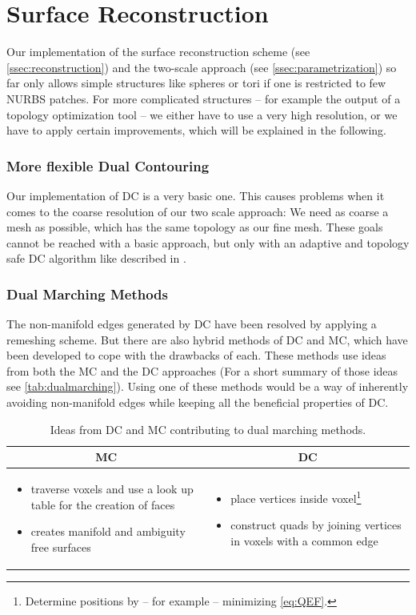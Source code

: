 \chapter{Surface Reconstruction}
\label{appx:AltSurfRecon}
Our implementation of the surface reconstruction scheme (see \autoref{ssec:reconstruction}) and the two-scale approach (see \autoref{ssec:parametrization}) so far only allows simple structures like spheres or tori if one is restricted to few NURBS patches. For more complicated structures -- for example the output of a topology optimization tool -- we either have to use a very high resolution, or we have to apply certain improvements, which will be explained in the following.

\subsection*{More flexible Dual Contouring}
Our implementation of \ac{DC} is a very basic one. This causes problems when it comes to the coarse resolution of our two scale approach: We need as coarse a mesh as possible, which has the same topology as our fine mesh. These goals cannot be reached with a basic approach, but only with an adaptive and topology safe \ac{DC} algorithm like described in \cite{Hermite2002}.

\subsection*{Dual Marching Methods}
The non-manifold edges generated by \ac{DC} have been resolved by applying a remeshing scheme. But there are also hybrid methods of \ac{DC} and \ac{MC}, which have been developed to cope with the drawbacks of each. These methods use ideas from both the \ac{MC} and the \ac{DC} approaches (For a short summary of those ideas see \autoref{tab:dualmarching}). Using one of these methods would be a way of inherently avoiding non-manifold edges while keeping all the beneficial properties of \ac{DC}.
\begin{table}[H]
\begin{tabularx}{\textwidth}{X|X}
\multicolumn{1}{c|}{\acl{MC}} 
    & \multicolumn{1}{c}{\acl{DC}} 
\\
\hline
\begin{itemize}[ topsep = 0pt, leftmargin=1em]
\item traverse voxels and use a look up table for the creation of faces
\item creates manifold and ambiguity free surfaces
\end{itemize}
&
\begin{itemize}[ topsep = 0pt, leftmargin=1em]
\item place vertices inside voxel\footnote{Determine positions by -- for example -- minimizing \autoref{eq:QEF}.}
\item construct \acp{quad} by joining vertices in voxels with a common edge
\end{itemize}
\end{tabularx}
\caption{Ideas from \ac{DC} and \ac{MC} contributing to dual marching methods.}
\label{tab:dualmarching}
\end{table}

